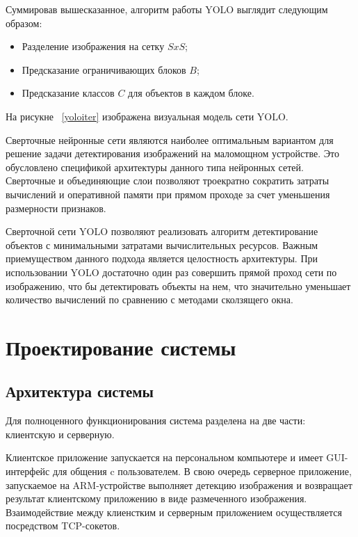 \documentclass[a4paper,english,russian]{G2-105}
\begin{document}
\par Суммировав вышесказанное, алгоритм работы YOLO выглядит следующим образом:
\begin{itemize}
\item Разделение изображения на сетку $SxS$;
\item Предсказание ограничивающих блоков $B$;
\item Предсказание классов $C$ для объектов в каждом блоке.
\end{itemize}
\par На рисукне ~\ref{yoloiter} изображена визуальная модель сети YOLO.
\ttl
{}
\par Сверточные нейронные сети являются наиболее оптимальным вариантом для решение задачи детектирования изображений на маломощном устройстве. Это обусловлено спецификой архитектуры данного типа нейронных сетей. Сверточные и объединяющие слои позволяют троекратно сократить затраты вычислений и оперативной памяти при прямом проходе за счет уменьшения размерности признаков.
\par Сверточной сети YOLO позволяют реализовать алгоритм детектирование объектов с минимальными затратами вычислительных ресурсов. Важным приемуществом данного подхода является целостность архитектуры. При использовании YOLO достаточно один раз совершить прямой проход сети по изображению, что бы детектировать объекты на нем, что значительно уменьшает количество вычислений по сравнению с методами сколзящего окна.
\chapter{Проектирование системы}
\section{Архитектура системы}
\par Для полноценного функционирования система разделена на две части: клиентскую и серверную.
\par Клиентское приложение запускается на персональном компьютере и имеет GUI-интерфейс для общения c пользователем. В свою очередь серверное приложение, запускаемое на ARM-устройстве выполняет детекцию изображения и возвращает результат клиентскому приложению в виде размеченного изображения. Взаимодействие между клиенстким и серверным приложением осуществляется посредством TCP-сокетов.
\ttl
\end{document}
